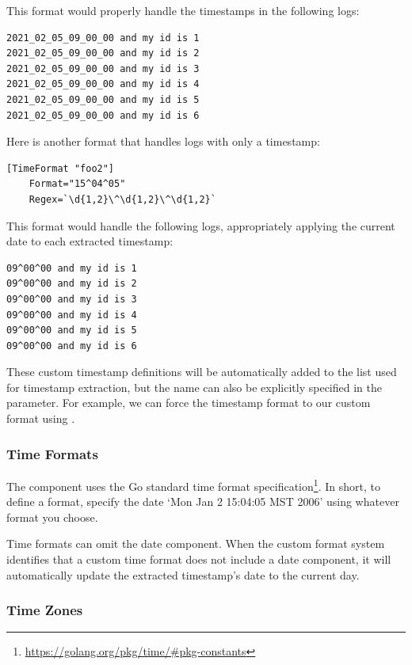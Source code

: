 This format would properly handle the timestamps in the following logs:

\begin{verbatim}
2021_02_05_09_00_00 and my id is 1
2021_02_05_09_00_00 and my id is 2
2021_02_05_09_00_00 and my id is 3
2021_02_05_09_00_00 and my id is 4
2021_02_05_09_00_00 and my id is 5
2021_02_05_09_00_00 and my id is 6
\end{verbatim}

Here is another format that handles logs with only a timestamp:

\begin{verbatim}
[TimeFormat "foo2"]
	Format="15^04^05"
	Regex=`\d{1,2}\^\d{1,2}\^\d{1,2}`
\end{verbatim}

This format would handle the following logs, appropriately applying the current date to each extracted timestamp:

\begin{verbatim}
09^00^00 and my id is 1
09^00^00 and my id is 2
09^00^00 and my id is 3
09^00^00 and my id is 4
09^00^00 and my id is 5
09^00^00 and my id is 6
\end{verbatim}

These custom timestamp definitions will be automatically added to the list used for timestamp extraction, but the name can also be explicitly specified in the  parameter.  For example, we can force the timestamp format to our custom format using .

\subsubsection{Time Formats}

The  component uses the Go standard time format specification\footnote{\href{https://golang.org/pkg/time/\#pkg-constants}{https://golang.org/pkg/time/\#pkg-constants}}. In short, to define a format, specify the date `Mon Jan 2 15:04:05 MST 2006' using whatever format you choose.

Time formats can omit the date component.  When the custom format system identifies that a custom time format does not include a date component, it will automatically update the extracted timestamp's date to the current day.

\subsubsection{Time Zones}

